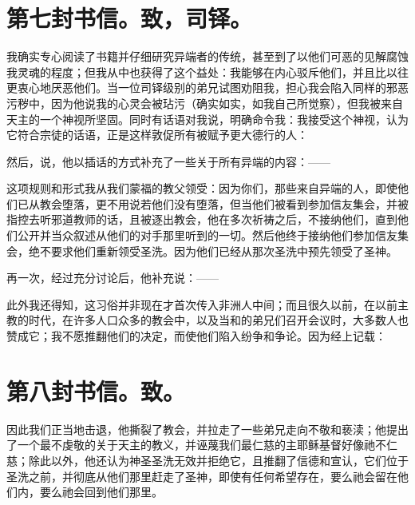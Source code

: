 
\section{第七封书信。致，司铎。}

我确实专心阅读了书籍并仔细研究异端者的传统，甚至到了以他们可恶的见解腐蚀我灵魂的程度；但我从中也获得了这个益处：我能够在内心驳斥他们，并且比以往更衷心地厌恶他们。当一位司铎级别的弟兄试图劝阻我，担心我会陷入同样的邪恶污秽中，因为他说我的心灵会被玷污（确实如实，如我自己所觉察），但我被来自天主的一个神视所坚固。同时有话语对我说，明确命令我：我接受这个神视，认为它符合宗徒的话语，正是这样敦促所有被赋予更大德行的人：\par

然后，说，他以插话的方式补充了一些关于所有异端的内容：——\par

这项规则和形式我从我们蒙福的教父领受：因为你们，那些来自异端的人，即使他们已从教会堕落，更不用说若他们没有堕落，但当他们被看到参加信友集会，并被指控去听邪道教师的话，且被逐出教会，他在多次祈祷之后，不接纳他们，直到他们公开并当众叙述从他们的对手那里听到的一切。然后他终于接纳他们参加信友集会，绝不要求他们重新领受圣洗。因为他们已经从那次圣洗中预先领受了圣神。\par

再一次，经过充分讨论后，他补充说：——\par

此外我还得知，这习俗并非现在才首次传入非洲人中间；而且很久以前，在以前主教的时代，在许多人口众多的教会中，以及当和的弟兄们召开会议时，大多数人也赞成它；我不愿推翻他们的决定，而使他们陷入纷争和争论。因为经上记载：\par


\section{第八封书信。致。}

因此我们正当地击退，他撕裂了教会，并拉走了一些弟兄走向不敬和亵渎；他提出了一个最不虔敬的关于天主的教义，并诬蔑我们最仁慈的主耶稣基督好像祂不仁慈；除此以外，他还认为神圣圣洗无效并拒绝它，且推翻了信德和宣认，它们位于圣洗之前，并彻底从他们那里赶走了圣神，即使有任何希望存在，要么祂会留在他们内，要么祂会回到他们那里。\par

